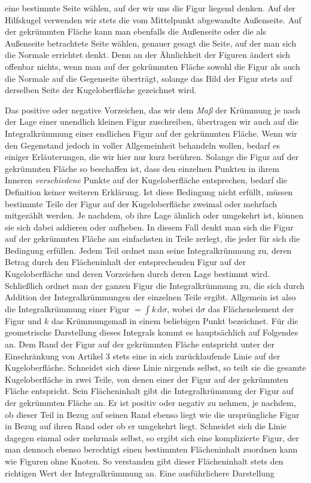 %
eine bestimmte Seite wählen, auf der wir uns die Figur liegend denken. Auf der Hilfskugel verwenden wir stets die vom Mittelpunkt abgewandte Außenseite. Auf der gekrümmten Fläche kann man ebenfalls die Außenseite oder die als Außenseite betrachtete Seite wählen, genauer gesagt die Seite, auf der man sich die Normale errichtet denkt. Denn an der Ähnlichkeit der Figuren ändert sich offenbar nichts, wenn man auf der gekrümmten Fläche sowohl die Figur als auch die Normale auf die Gegenseite überträgt, solange das Bild der Figur stets auf derselben Seite der Kugeloberfläche gezeichnet wird.

Das positive oder negative Vorzeichen, das wir dem \textit{Maß} der Krümmung je nach der Lage einer unendlich kleinen Figur zuschreiben, übertragen wir auch auf die Integralkrümmung einer endlichen Figur auf der gekrümmten Fläche. Wenn wir den Gegenstand jedoch in voller Allgemeinheit behandeln wollen, bedarf es einiger Erläuterungen, die wir hier nur kurz berühren. Solange die Figur auf der gekrümmten Fläche so beschaffen ist, dass den einzelnen Punkten in ihrem Inneren \textit{verschiedene} Punkte auf der Kugeloberfläche entsprechen, bedarf die Definition keiner weiteren Erklärung. Ist diese Bedingung nicht erfüllt, müssen bestimmte Teile der Figur auf der Kugeloberfläche zweimal oder mehrfach mitgezählt werden. Je nachdem, ob ihre Lage ähnlich oder umgekehrt ist, können sie sich dabei addieren oder aufheben. In diesem Fall denkt man sich die Figur auf der gekrümmten Fläche am einfachsten in Teile zerlegt, die jeder für sich die Bedingung erfüllen. Jedem Teil ordnet man seine Integralkrümmung zu, deren Betrag durch den Flächeninhalt der entsprechenden Figur auf der Kugeloberfläche und deren Vorzeichen durch deren Lage bestimmt wird. Schließlich ordnet man der ganzen Figur die Integralkrümmung zu, die sich durch Addition der Integralkrümmungen der einzelnen Teile ergibt. Allgemein ist also die Integralkrümmung einer Figur \(=\int k\,\mathrm{d}\sigma\), wobei \(\mathrm{d}\sigma\) das Flächenelement der Figur und \(k\) das Krümmungsmaß in einem beliebigen Punkt bezeichnet. Für die geometrische Darstellung dieses Integrals kommt es hauptsächlich auf Folgendes an. Dem Rand der Figur auf der gekrümmten Fläche entspricht unter der Einschränkung von Artikel 3 stets eine in sich zurücklaufende Linie auf der Kugeloberfläche. Schneidet sich diese Linie nirgends selbst, so teilt sie die gesamte Kugeloberfläche in zwei Teile, von denen einer der Figur auf der gekrümmten Fläche entspricht. Sein Flächeninhalt gibt die Integralkrümmung der Figur auf der gekrümmten Fläche an. Er ist positiv oder negativ zu nehmen, je nachdem, ob dieser Teil in Bezug auf seinen Rand ebenso liegt wie die ursprüngliche Figur in Bezug auf ihren Rand oder ob er umgekehrt liegt. Schneidet sich die Linie dagegen einmal oder mehrmals selbst, so ergibt sich eine komplizierte Figur, der man dennoch ebenso berechtigt einen bestimmten Flächeninhalt zuordnen kann wie Figuren ohne Knoten. So verstanden gibt dieser Flächeninhalt stets den richtigen Wert der Integralkrümmung an. Eine ausführlichere Darstellung %
